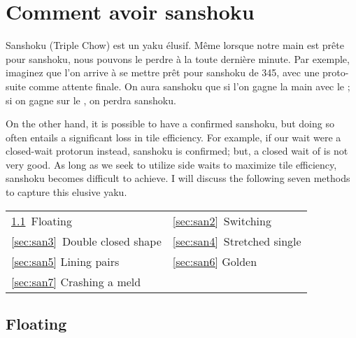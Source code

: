\newpage
\section{Comment avoir {\jap sanshoku}}  \label{sec:san}

{\jap Sanshoku} (Triple Chow) est un {\jap yaku} élusif. 
Même lorsque notre main est prête pour {\jap sanshoku}, nous pouvons le perdre à la toute dernière minute. Par exemple, imaginez que l'on arrive à se mettre prêt pour {\jap sanshoku} de 345, avec une proto-suite {\LARGE{}} comme attente finale. On aura {\jap sanshoku} que si l'on gagne la main avec le {\LARGE{}}; si on gagne sur le {\LARGE{}}, on perdra 
{\jap sanshoku}.

\bigskip
On the other hand, it is possible to have a confirmed {\jap sanshoku}, but doing so often entails a significant loss in tile efficiency. For example, if our wait were a closed-wait protorun {\LARGE{}} instead, {\jap sanshoku} is confirmed; but, a closed wait of {\LARGE{}} is not very good. As long as we seek to utilize side waits to maximize tile efficiency, {\jap sanshoku} becomes difficult to achieve. I will discuss the following seven methods to capture this elusive {\jap yaku}. 

\bigskip
\begin{tabular}{l l}
\ref{sec:san1}~Floating & \ref{sec:san2}~Switching\\
\ref{sec:san3}~Double closed shape & \ref{sec:san4}~Stretched single\\
\ref{sec:san5} Lining pairs &\ref{sec:san6} Golden\\
\ref{sec:san7} Crashing a meld\\
\end{tabular}

\newpage

\subsection{Floating}\label{sec:san1}

